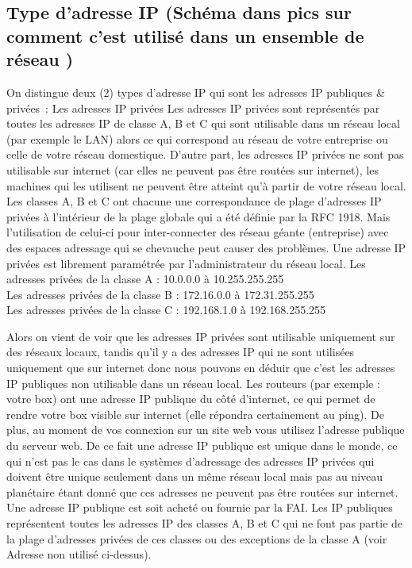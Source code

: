 \subsection{Type d’adresse IP (Schéma dans pics sur comment c’est utilisé dans un ensemble de réseau )}
On distingue deux (2) types d’adresse IP qui sont les adresses IP publiques & privées : 
Les adresses IP privées Les adresses IP privées sont représentés par toutes les
adresses IP de classe A, B et C qui sont utilisable dans un réseau local (par
exemple le LAN) alors ce qui correspond au réseau de votre entreprise ou celle
de votre réseau domestique. D’autre part, les adresses IP privées ne sont pas
utilisable sur internet (car elles ne peuvent pas être routées sur internet),
les machines qui les utilisent ne peuvent être atteint qu’à partir de votre
réseau local. Les classes A, B et C ont chacune une correspondance de plage
d’adresses IP privées à l’intérieur de la plage globale qui a été définie par
la RFC 1918. Mais l’utilisation  de celui-ci pour inter-connecter des réseau
géante (entreprise) avec des espaces adressage qui se chevauche peut causer des
problèmes. Une adresse IP privées est librement paramétrée par l’administrateur
du réseau local.
\vspace{1cm}
Les adresses privées de la classe A : 10.0.0.0 à 10.255.255.255\\
Les adresses privées de la classe B : 172.16.0.0 à 172.31.255.255\\
Les adresses privées de la classe C : 192.168.1.0 à 192.168.255.255\\
\vspace{1cm}

Alors on vient de voir que les adresses IP privées sont utilisable uniquement
sur des réseaux locaux, tandis qu’il y a des adresses IP qui ne sont utilisées
uniquement que sur internet donc nous pouvons en déduir que c’est les adresses
IP publiques non utilisable dans un réseau local. Les routeurs (par exemple :
votre box) ont une adresse IP publique du côté d’internet, ce qui permet de
rendre votre box visible sur internet (elle répondra certainement au ping). De
plus, au moment de vos connexion sur un site web vous utilisez l’adresse
publique du serveur web. De ce fait une adresse IP publique est unique dans le
monde, ce qui n’est pas le cas dans le systèmes d’adressage des adresses IP
privées qui doivent être unique seulement dans un même réseau local mais pas au
niveau planétaire étant donné que ces adresses ne peuvent pas être routées sur
internet. Une adresse IP publique est soit acheté ou fournie par la FAI.  Les
IP publiques représentent toutes les adresses IP des classes A, B et C qui ne
font pas partie de la plage d’adresses privées de ces classes ou des exceptions
de la classe A (voir Adresse non utilisé ci-dessus).


